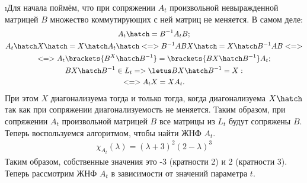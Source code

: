 \i Для начала поймём, что при сопряжении $A_t$ произвольной невыражденной матрицей $B$ множество коммутирующих с ней матриц не меняется. В самом деле:
\begin{gather*}
    A_t\hatch = B^{-1}A_tB;\\
    A_t\hatch X\hatch = X\hatch A_t\hatch <=> B^{-1}ABX\hatch = X\hatch B^{-1}AB <=>\\
    <=> A_t\brackets{B^ X\hatch B^{-1}} = \brackets{B X\hatch B^{-1}}A_t;\\
    B X\hatch B^{-1} \in L_t => \letus B X\hatch B^{-1} = X:\\
    <=> A_t X = X A_t.
\end{gather*}
При этом $X$ диагонализуема тогда и только тогда, когда диагонализуема $X\hatch$ так как при сопряжении диагонализуемость не меняется. Таким образом, при сопряжении $A_t$ произвольной матрицей $B$ все матрицы из $L_t$ будут сопряжены $B$.\\
Теперь воспользуемся алгоритмом, чтобы найти ЖНФ $A_t$.
\begin{gather*}
    \chi_{A_t}(\lambda) = (\lambda + 3)^2(2 - \lambda)^3
\end{gather*}
Таким образом, собственные значения это -3 (кратности 2) и 2 (кратности 3). Теперь рассмотрим ЖНФ $A_t$ в зависимости от значений параметра $t$.
